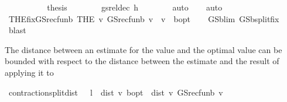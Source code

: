 \begin{isabellebody}
\ \ \ \ \isamarkupfalse%
\isanewline
\ \ \ \ \isamarkupfalse%
\ {\isacharquery}{\kern0pt}thesis\isanewline
\ \ \ \ \ \ \isamarkupfalse%
\ gs{\isacharunderscore}{\kern0pt}rel{\isacharunderscore}{\kern0pt}dec\ h\isanewline
\ \ \ \ \ \ \isamarkupfalse%
\ auto\isanewline
\ \ \isamarkupfalse%
\isanewline
{}\isamarkupfalse%
\ auto%
\endisatagproof
{\isafoldproof}%
%
\isadelimproof
\isanewline
%
\endisadelimproof
\isanewline
\isanewline
{}\isamarkupfalse%
\ THE{\isacharunderscore}{\kern0pt}fix{\isacharunderscore}{\kern0pt}GS{\isacharunderscore}{\kern0pt}rec{\isacharunderscore}{\kern0pt}fun\isactrlsub b{\isacharcolon}{\kern0pt}\ {\isachardoublequoteopen}{\isacharparenleft}{\kern0pt}THE\ v{\isachardot}{\kern0pt}\ GS{\isacharunderscore}{\kern0pt}rec{\isacharunderscore}{\kern0pt}fun\isactrlsub b\ v\ {\isacharequal}{\kern0pt}\ v{\isacharparenright}{\kern0pt}\ {\isacharequal}{\kern0pt}\ {\isasymnu}\isactrlsub b{\isacharunderscore}{\kern0pt}opt{\isachardoublequoteclose}\isanewline
%
\isadelimproof
\ \ %
\endisadelimproof
%
\isatagproof
{}\isamarkupfalse%
\ GS{\isachardot}{\kern0pt}{\isasymL}\isactrlsub b{\isacharunderscore}{\kern0pt}lim{\isacharparenleft}{\kern0pt}{}{\isacharparenright}{\kern0pt}\ GS{\isachardot}{\kern0pt}{\isasymL}\isactrlsub b{\isacharunderscore}{\kern0pt}split{\isacharunderscore}{\kern0pt}fix\isanewline
\ \ \isamarkupfalse%
\ blast{\isacharplus}{\kern0pt}%
\endisatagproof
{\isafoldproof}%
%
\isadelimproof
%
\endisadelimproof
%
\begin{isamarkuptext}%
The distance between an estimate for the value and the optimal value can be bounded with respect to 
the distance between the estimate and the result of applying it to %
\end{isamarkuptext}\isamarkuptrue%
\isamarkupfalse%
\ contraction{\isacharunderscore}{\kern0pt}{\isasymL}{\isacharunderscore}{\kern0pt}split{\isacharunderscore}{\kern0pt}dist{\isacharcolon}{\kern0pt}\ {\isachardoublequoteopen}{\isacharparenleft}{\kern0pt}{}\ {\isacharminus}{\kern0pt}\ l{\isacharparenright}{\kern0pt}\ {\isacharasterisk}{\kern0pt}\ dist\ v\ {\isasymnu}\isactrlsub b{\isacharunderscore}{\kern0pt}opt\ {\isasymle}\ dist\ v\ {\isacharparenleft}{\kern0pt}GS{\isacharunderscore}{\kern0pt}rec{\isacharunderscore}{\kern0pt}fun\isactrlsub b\ v{\isacharparenright}{\kern0pt}{\isachardoublequoteclose}\isanewline
%
\isadelimproof
\ \ %
\endisadelimproof

\end{isabellebody}
